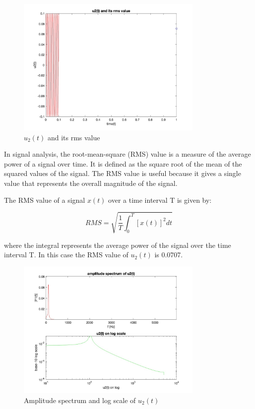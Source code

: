 \documentclass[
	a4paper,
	11pt,
]{article}
\begin{document}
\begin{figure}[htb!]
    \centerline{\includegraphics[width=9cm]{A4/a4.image1.jpg}}
    \caption{\(u_2(t)\) and its rms value}
\end{figure}

In signal analysis, the root-mean-square (RMS) value is a measure of the average power of a signal over time. It is defined as the square root of the mean of the squared values of the signal. The RMS value is useful because it gives a single value that represents the overall magnitude of the signal. 

The RMS value of a signal \(x(t)\) over a time interval T is given by:

\begin{equation}
RMS = \sqrt{\frac{1}{T} \int_{0}^{T} [x(t)]^2 dt}
\end{equation}

where the integral represents the average power of the signal over the time interval T. In this case the RMS value of \(u_2(t)\) is 0.0707.
\begin{figure}[htb!]
    \centerline{\includegraphics[width=9cm]{A4/a4.image2.jpg}}
    \caption{Amplitude spectrum and log scale of \(u_2(t)\)}
\end{figure}
\end{document}
